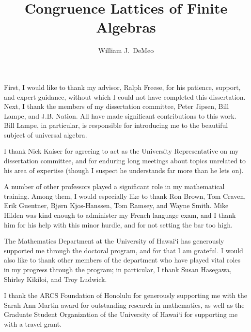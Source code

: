\documentclass[cm,dissertation]{uhthesis}
\theoremstyle{plain}
\theoremstyle{definition}
\theoremstyle{remark}
\numberwithin{theorem}{section}
\numberwithin{claim}{chapter}
\numberwithin{equation}{section}
\numberwithin{conjecture}{chapter}
\newcommand{\<}{\ensuremath{\langle}}
\renewcommand{\>}{\ensuremath{\rangle}}
\newcommand{\0}{\ensuremath{\mathbf{0}}}
\newcommand{\1}{\ensuremath{\mathbf{1}}}
\newcommand{\2}{\ensuremath{\mathbf{2}}}
\newcommand{\3}{\ensuremath{\mathbf{3}}}
\newcommand{\4}{\ensuremath{\mathbf{4}}}
\newcommand{\5}{\ensuremath{\mathbf{5}}}
\begin{document}
    \title{{\bf Congruence Lattices of Finite Algebras}}
    \author{William J.~DeMeo}


\maketitle

\begin{frontmatter}

\copyrightpage


\begin{acknowledgments}
First, I would like to thank my advisor, Ralph Freese, for his patience, support, and expert 
guidance, without which I could not have completed this dissertation.
Next, I thank the members of my dissertation
committee, Peter Jipsen, Bill Lampe, and J.B. Nation.  All have made
significant contributions to this work.
Bill Lampe, in particular, is responsible for introducing me to the
beautiful subject of universal algebra.

I thank Nick Kaiser for agreeing to act as the University Representative on my
dissertation committee, and for enduring long meetings about topics unrelated to his
area of expertise (though I suspect he understands far more than he lets on).

A number of other professors played a significant role in my mathematical
training. Among them, I would especially like to thank Ron Brown, Tom
Craven, Erik Guentner, Bj{\o}rn Kjos-Hanssen, Tom Ramsey, and Wayne Smith.  Mike
Hilden was kind enough 
to administer my French language exam, and I thank him for his help
with this minor hurdle, and for not setting the bar too high.

The Mathematics Department at the University of Hawai`i has generously supported
me through the doctoral program, and for that I am grateful.
I would also like to thank other members of the department who have played vital
roles in my progress through the program; in particular, I thank Susan Hasegawa,
Shirley Kikiloi, and Troy Ludwick. 

I thank the ARCS Foundation of Honolulu for generously supporting me with the
Sarah Ann Martin award for outstanding research in mathematics, 
as well as the Graduate Student Organization of the
University of Hawai`i for supporting me with a travel grant.  


\end{acknowledgments}
\end{frontmatter}
\end{document}
